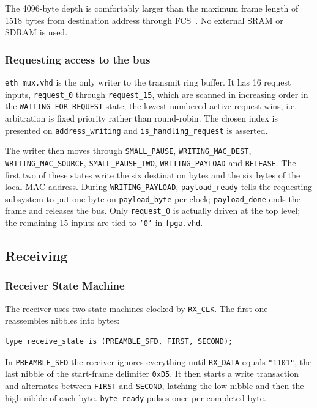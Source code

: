 \documentclass[11pt,a4paper]{article}
\begin{document}
The 4096-byte depth is comfortably larger than the maximum frame length of 1518 bytes from destination address through FCS~\cite{ieee8023}. No external SRAM or SDRAM is used.

\subsubsection{Requesting access to the bus}
\texttt{eth\_mux.vhd} is the only writer to the transmit ring buffer. It has 16 request inputs, \texttt{request\_0} through \texttt{request\_15}, which are scanned in increasing order in the \texttt{WAITING\_FOR\_REQUEST} state; the lowest-numbered active request wins, i.e. arbitration is fixed priority rather than round-robin. The chosen index is presented on \texttt{address\_writing} and \texttt{is\_handling\_request} is asserted.

The writer then moves through \texttt{SMALL\_PAUSE}, \texttt{WRITING\_MAC\_DEST}, \texttt{WRITING\_MAC\_SOURCE}, \texttt{SMALL\_PAUSE\_TWO}, \texttt{WRITING\_PAYLOAD} and \texttt{RELEASE}. The first two of these states write the six destination bytes and the six bytes of the local MAC address. During \texttt{WRITING\_PAYLOAD}, \texttt{payload\_ready} tells the requesting subsystem to put one byte on \texttt{payload\_byte} per clock; \texttt{payload\_done} ends the frame and releases the bus. Only \texttt{request\_0} is actually driven at the top level; the remaining 15 inputs are tied to \texttt{'0'} in \texttt{fpga.vhd}.

\subsection{Receiving}
\label{sec:rx_fsm}
\subsubsection{Receiver State Machine}
The receiver uses two state machines clocked by \texttt{RX\_CLK}. The first one reassembles nibbles into bytes:

\begin{lstlisting}
type receive_state is (PREAMBLE_SFD, FIRST, SECOND);
\end{lstlisting}

In \texttt{PREAMBLE\_SFD} the receiver ignores everything until \texttt{RX\_DATA} equals \texttt{"1101"}, the last nibble of the start-frame delimiter \texttt{0xD5}. It then starts a write transaction and alternates between \texttt{FIRST} and \texttt{SECOND}, latching the low nibble and then the high nibble of each byte. \texttt{byte\_ready} pulses once per completed byte.
\end{document}

